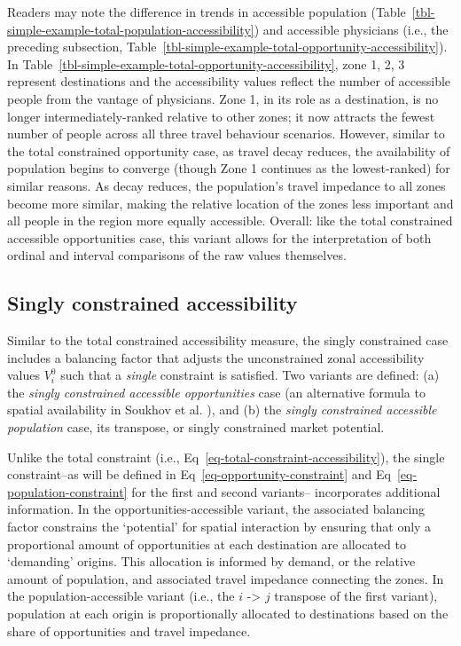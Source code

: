 \documentclass[
  10pt,
  letterpaper,
]{article}
\begin{document}
Readers may note the difference in trends in accessible population
(Table~\ref{tbl-simple-example-total-population-accessibility}) and
accessible physicians (i.e., the preceding subsection,
Table~\ref{tbl-simple-example-total-opportunity-accessibility}). In
Table~\ref{tbl-simple-example-total-opportunity-accessibility}, zone 1,
2, 3 represent destinations and the accessibility values reflect the
number of accessible people from the vantage of physicians. Zone 1, in
its role as a destination, is no longer intermediately-ranked relative
to other zones; it now attracts the fewest number of people across all
three travel behaviour scenarios. However, similar to the total
constrained opportunity case, as travel decay reduces, the availability
of population begins to converge (though Zone 1 continues as the
lowest-ranked) for similar reasons. As decay reduces, the population's
travel impedance to all zones become more similar, making the relative
location of the zones less important and all people in the region more
equally accessible. Overall: like the total constrained accessible
opportunities case, this variant allows for the interpretation of both
ordinal and interval comparisons of the raw values themselves.

\subsection{Singly constrained
accessibility}\label{singly-constrained-accessibility}

Similar to the total constrained accessibility measure, the singly
constrained case includes a balancing factor that adjusts the
unconstrained zonal accessibility values \(V^0_i\) such that a
\emph{single} constraint is satisfied. Two variants are defined: (a) the
\emph{singly constrained accessible opportunities} case (an alternative
formula to spatial availability in Soukhov et al.
\citep{soukhovIntroducingSpatialAvailability2023}), and (b) the
\emph{singly constrained accessible population} case, its transpose, or
singly constrained market potential.

Unlike the total constraint (i.e.,
Eq~\ref{eq-total-constraint-accessibility}), the single constraint--as
will be defined in Eq~\ref{eq-opportunity-constraint} and
Eq~\ref{eq-population-constraint} for the first and second variants--
incorporates additional information. In the opportunities-accessible
variant, the associated balancing factor constrains the `potential' for
spatial interaction by ensuring that only a proportional amount of
opportunities at each destination are allocated to `demanding' origins.
This allocation is informed by demand, or the relative amount of
population, and associated travel impedance connecting the zones. In the
population-accessible variant (i.e., the \(i\) -\textgreater{} \(j\)
transpose of the first variant), population at each origin is
proportionally allocated to destinations based on the share of
opportunities and travel impedance.
\end{document}
